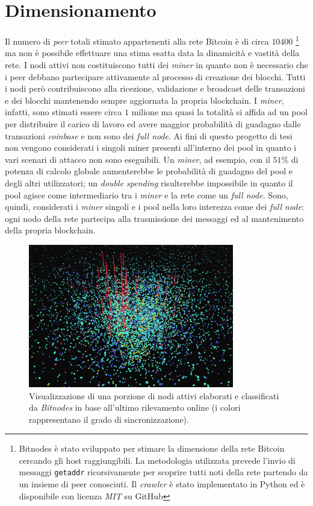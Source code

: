 \section{Dimensionamento}
Il numero di \textit{peer} totali stimato appartenenti alla rete Bitcoin è di circa $10400$ \cite{bitnodes}\footnote{Bitnodes è stato sviluppato per stimare la dimensione della rete Bitcoin cercando gli host raggiungibili. La metodologia utilizzata prevede l'invio di messaggi \texttt{getaddr} ricorsivamente per scoprire tutti noti della rete partendo da un insieme di peer conosciuti. Il \textit{crawler} è stato implementato in Python ed è disponibile con licenza \textit{MIT} su GitHub} ma non è possibile effettuare una stima esatta data la dinamicità e vastità della rete. I nodi attivi non costituiscono tutti dei \textit{miner} in quanto non è necessario che i peer debbano partecipare attivamente al processo di creazione dei blocchi. Tutti i nodi però contribuiscono alla ricezione, validazione e broadcast delle transazioni e dei blocchi mantenendo sempre aggiornata la propria blockchain. I \textit{miner}, infatti, sono stimati essere circa $1$ milione ma quasi la totalità si affida ad un pool per distribuire il carico di lavoro ed avere maggior probabilità di guadagno dalle transazioni \textit{coinbase} e non sono dei \textit{full node}.\newline
Ai fini di questo progetto di tesi non vengono considerati i singoli miner presenti all'interno dei pool in quanto i vari scenari di attacco non sono eseguibili. Un \textit{miner}, ad esempio, con il $51\%$ di potenza di calcolo globale aumenterebbe le probabilità di guadagno del pool e degli altri utilizzatori; un \textit{double spending} risulterebbe impossibile in quanto il pool agisce come intermediario tra i \textit{miner} e la rete come un \textit{full node}.\newline
Sono, quindi, considerati i \textit{miner} singoli e i pool nella loro interezza come dei \textit{full node}: ogni nodo della rete partecipa alla trasmissione dei messaggi ed al mantenimento della propria blockchain.
\begin{figure}[H]
    \centering
    \includegraphics[width=0.8\textwidth]{images/bitnodes.png}
    \caption{Visualizzazione di una porzione di nodi attivi elaborati e classificati da \textit{Bitnodes} in base all'ultimo rilevamento online (i colori rappresentano il grado di sincronizzazione).}
\end{figure}
